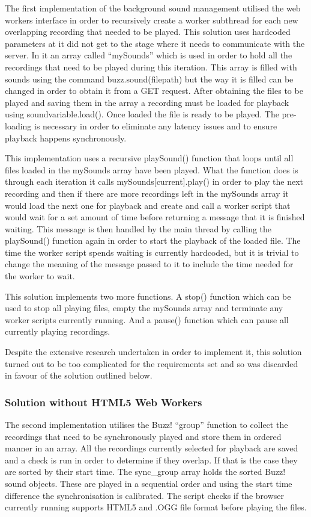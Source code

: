 \documentclass{l3proj}
\begin{document}
The first implementation of the background sound management utilised the web workers interface in order to recursively create a worker subthread for each new overlapping recording that needed to be played. This solution uses hardcoded parameters at it did not get to the stage where it needs to communicate with the server. In it an array called “mySounds” which is used in order to hold all the recordings that need to be played during this iteration. This array is filled with sounds using the command buzz.sound(filepath) but the way it is filled can be changed in order to obtain it from a GET request. After obtaining the files to be played and saving them in the array a recording must be loaded for playback using soundvariable.load(). Once loaded the file is ready to be played. The pre-loading is necessary in order to eliminate any latency issues and to ensure playback happens synchronously.

This implementation uses a recursive playSound() function that loops until all files loaded in the mySounds array have been played. What the function does is through each iteration it calls mySounds[current].play() in order to play the next recording and then if there are more recordings left in the mySounds array it would load the next one for playback and create and call a worker script that would wait for a set amount of time before returning a message that it is finished waiting. This message is then handled by the main thread by calling the playSound() function again in order to start the playback of the loaded file. The time the worker script spends waiting is currently hardcoded, but it is trivial to change the meaning of the message passed to it to include the time needed for the worker to wait.

This solution implements two more functions. A stop() function which can be used to stop all playing files, empty the mySounds array and terminate any worker scripts currently running. And a pause() function which can pause all currently playing recordings.

Despite the extensive research undertaken in order to implement it, this solution turned out to be too complicated for the requirements set and so was discarded in favour of the solution outlined below.

\subsubsection{Solution without HTML5 Web Workers}
The second implementation utilises the Buzz! “group” function to collect the recordings that need to be synchronously played and store them in ordered manner in an array. All the recordings currently selected for playback are saved and a check is run in order to determine if they overlap. If that is the case they are sorted by their start time. The sync_group array holds the sorted Buzz! sound objects. These are played in a sequential order and using the start time difference the synchronisation is calibrated. The script checks if the browser currently running supports HTML5  and .OGG file format before playing the files.
\end{document}
